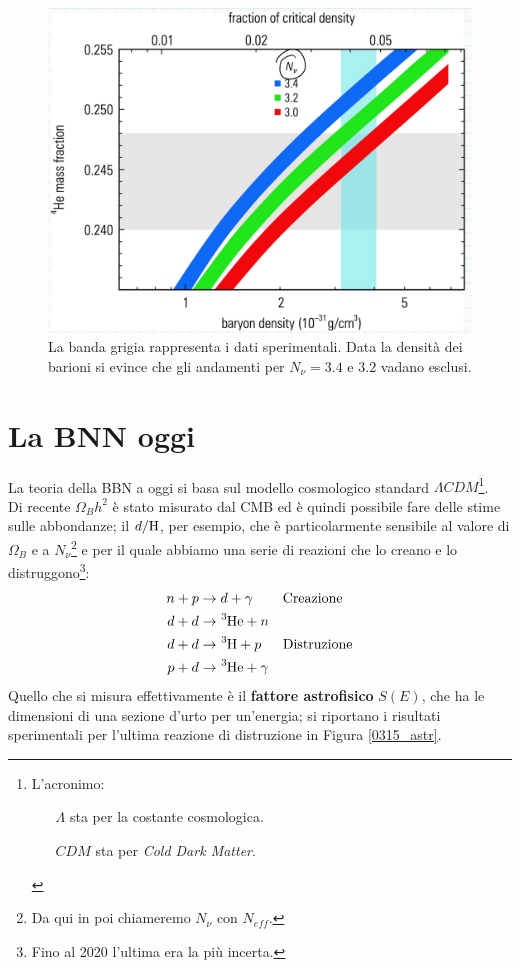 \begin{figure}[h]
    \centering
    \includegraphics[scale=0.2]{Immagini/0315_heliummassfraction2.png}
    \caption{La banda grigia rappresenta i dati sperimentali. Data la densità dei barioni si evince che gli andamenti per $N_\nu = 3.4$ e $3.2$ vadano esclusi.}
    \label{0315_Hefrac2}
\end{figure}


\section{La BNN oggi}
La teoria della BBN a oggi si basa sul modello cosmologico standard $\Lambda CDM$\footnote{L'acronimo:%
\begin{itemize}
    \item[$\Lambda$] sta per la costante cosmologica.
    \item[$CDM$] sta per \textit{Cold Dark Matter}.
\end{itemize}
}.\\
Di recente $\Omega_B h^2$ è stato misurato dal CMB ed è quindi possibile fare delle stime sulle abbondanze; il $d/\ce{H}$, per esempio, che è particolarmente sensibile al valore di $\Omega_B$ e a $N_\nu$\footnote{Da qui in poi chiameremo $N_\nu$ con $N_{eff}$.} e per il quale abbiamo una serie di reazioni che lo creano e lo distruggono\footnote{Fino al 2020 l'ultima era la più incerta.}:
\begin{displaymath}
\begin{aligned}
n + p &\to d + \gamma & &\text{Creazione} \\
d + d &\to \ce{^3He} + n & \\
d + d &\to \ce{^3H}  + p &  &\text{Distruzione} \\
p + d &\to \ce{^3He} + \gamma & 
\end{aligned}
\end{displaymath}
Quello che si misura effettivamente è il \textbf{fattore astrofisico} $S(E)$, che ha le dimensioni di una sezione d'urto per un'energia; si riportano i risultati sperimentali per l'ultima reazione di distruzione in Figura \ref{0315_astr}.

